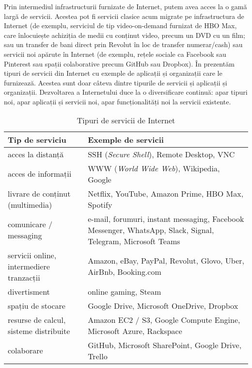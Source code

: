 Prin intermediul infrastructurii furnizate de Internet, putem avea acces la o gamă largă de servicii.
Acestea pot fi servicii clasice acum migrate pe infrastructura de Internet (de exemplu, serviciul de tip video-on-demand furnizat de HBO Max, care înlocuiește achiziția de medii cu conținut video, precum un DVD cu un film; sau un transfer de bani direct prin Revolut în loc de transfer numerar/cash) sau servicii noi apărute în Internet (de exemplu, rețele sociale ca Facebook sau Pinterest sau spații colaborative precum GitHub sau Dropbox).
În  prezentăm tipuri de servicii din Internet cu exemple de aplicații și organizații care le furnizează.
Acestea sunt doar câteva dintre tipurile de servicii și aplicații și organizații.
Dezvoltarea a Internetului duce la o diversificare continuă: apar tipuri noi, apar aplicații și servicii noi, apar funcționalități noi la servicii existente.

\begin{table}[!htb]
  \scriptsize
  \begin{center}
    \begin{tabular}{ p{} p{} }
      \toprule
        \textbf{Tip de serviciu} &
        \textbf{Exemple de servicii} \\
      \midrule
        acces la distanță &
        SSH (\textit{Secure Shell}), Remote Desktop, VNC \\
      \midrule
        acces de informații &
        WWW (\textit{World Wide Web}), Wikipedia, Google \\
      \midrule
        livrare de conținut (multimedia) &
        Netflix, YouTube, Amazon Prime, HBO Max, Spotify \\
      \midrule
        comunicare / messaging &
        e-mail, forumuri, instant messaging, Facebook Messenger, WhatsApp, Slack, Signal, Telegram, Microsoft Teams \\
      \midrule
        servicii online, intermediere tranzacții &
        Amazon, eBay, PayPal, Revolut, Glovo, Uber, AirBnb, Booking.com \\
      \midrule
        divertisment &
        online gaming, Steam \\
      \midrule
        spațiu de stocare &
        Google Drive, Microsoft OneDrive, Dropbox \\
      \midrule
        resurse de calcul, sisteme distribuite &
        Amazon EC2 / S3, Google Compute Engine, Microsoft Azure, Rackspace \\
      \midrule
        colaborare &
        GitHub, Microsoft SharePoint, Google Drive, Trello \\
      \bottomrule
    \end{tabular}
  \end{center}
  \caption{Tipuri de servicii de Internet}
  \label{tab:net:services}
\end{table}

